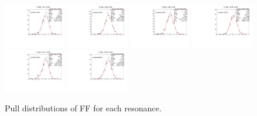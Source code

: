 \begin{figure}[h]
    \includegraphics[width=0.24\textwidth]{figure/io_wo_bkg/fitfrac/pull_fitfrac_res7_comb.pdf}
    \includegraphics[width=0.24\textwidth]{figure/io_wo_bkg/fitfrac/pull_fitfrac_res8_comb.pdf}
    \includegraphics[width=0.24\textwidth]{figure/io_wo_bkg/fitfrac/pull_fitfrac_res9_comb.pdf}
    \includegraphics[width=0.24\textwidth]{figure/io_wo_bkg/fitfrac/pull_fitfrac_res10_comb.pdf}
    \includegraphics[width=0.24\textwidth]{figure/io_wo_bkg/fitfrac/pull_fitfrac_res11_comb.pdf}
    \includegraphics[width=0.24\textwidth]{figure/io_wo_bkg/fitfrac/pull_fitfrac_res12_comb.pdf}
    \caption{Pull distributions of FF for each resonance.}
\label{fig:io_wo_bkg_pull_ff}
\end{figure}

